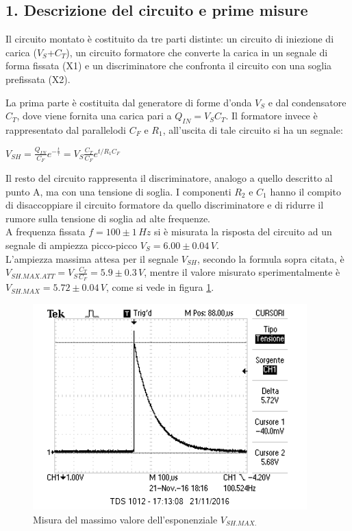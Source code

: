 \documentclass[10pt,a4paper]{article}
\begin{document}
\subsection*{1. Descrizione del circuito e prime misure}
Il circuito montato è costituito da tre parti distinte: un circuito di iniezione di carica ($V_S$+$C_T$), un circuito formatore che converte la carica in un segnale di forma fissata (X1) e un discriminatore che confronta il circuito con una soglia prefissata (X2).

La prima parte è costituita dal generatore di forme d'onda $V_S$ e dal condensatore $C_T$, dove viene fornita una carica pari a $Q_{IN}=V_S C_T$. Il formatore invece è rappresentato dal parallelodi $C_F$ e $R_1$, all'uscita di tale circuito si ha un segnale:\\
\begin{center}
$V_{SH}=\frac{Q_{IN}}{C_F} e^{-\frac{t}{\tau}} = V_S \frac{C_T}{C_F} e^{t/R_1 C_F}$\\
\end{center}

Il resto del circuito rappresenta il discriminatore, analogo a quello descritto al punto A, ma con una tensione di soglia. I componenti $R_2$ e $C_1$ hanno il compito di disaccoppiare il circuito formatore da quello discriminatore e di ridurre il rumore sulla tensione di soglia ad alte frequenze.\\
A frequenza fissata $f = 100\pm 1 \, Hz$ si è misurata la risposta del circuito ad un segnale di ampiezza picco-picco $V_S = 6.00 \pm 0.04 \, V$.\\
L'ampiezza massima attesa per il segnale $V_{SH}$, secondo la formula sopra citata, è $V_{SH.MAX.ATT} = V_S \frac{C_T}{C_F} =  5.9 \pm 0.3 \, V$, mentre il valore misurato sperimentalmente è $V_{SH.MAX} = 5.72 \pm 0.04 \, V$, come si vede in figura \ref{esponenziale}.\\

\begin{figure}[h]
\centering
\includegraphics[scale=1.0]{immagini/esponenziale.png}
\caption{Misura del massimo valore dell'esponenziale $V_{SH.MAX.}$}
\label{esponenziale}
\end{figure}
\end{document}
